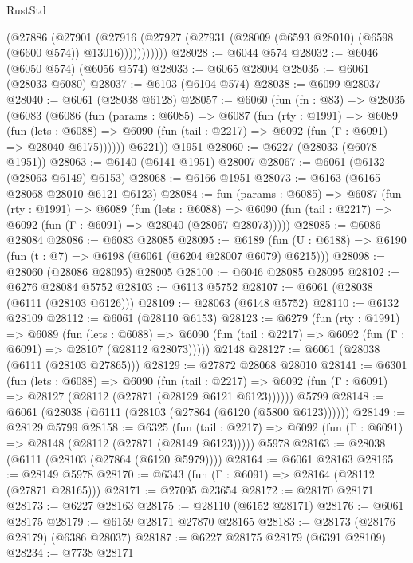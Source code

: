 \begin{lexlean}{RustStd}
\begin{coremodule}
{\begin{coremodule}
{{{{{{{{{{{{{{{{{{{{{{{{{{              (@27886
                (@27901
                  (@27916
                    (@27927 (@27931 (@28009 (@6593 @28010) (@6598 (@6600 @574)) @13016)))))))))))
@28028 := @6044 @574
@28032 := @6046 (@6050 @574) (@6056 @574)
@28033 := @6065 @28004
@28035 := @6061 (@28033 @6080)
@28037 := @6103 (@6104 @574)
@28038 := @6099 @28037
@28040 := @6061 (@28038 @6128)
@28057 := @6060
    (fun (fn : @83) =>
    @28035
      (@6083
        (@6086
          (fun (params : @6085) =>
          @6087
            (fun (rty : @1991) =>
            @6089
              (fun (lets : @6088) =>
              @6090 (fun (tail : @2217) => @6092 (fun (Γ : @6091) => @28040 @6175))))))
        @6221))
    @1951
@28060 := @6227 (@28033 (@6078 @1951))
@28063 := @6140 (@6141 @1951) @28007
@28067 := @6061 (@6132 (@28063 @6149) @6153)
@28068 := @6166 @1951
@28073 := @6163 (@6165 @28068 @28010 @6121 @6123)
@28084 := fun (params : @6085) =>
  @6087
    (fun (rty : @1991) =>
    @6089
      (fun (lets : @6088) =>
      @6090 (fun (tail : @2217) => @6092 (fun (Γ : @6091) => @28040 (@28067 @28073)))))
@28085 := @6086 @28084
@28086 := @6083 @28085
@28095 := @6189
    (fun (U : @6188) => @6190 (fun (t : @7) => @6198 (@6061 (@6204 @28007 @6079) @6215)))
@28098 := @28060 (@28086 @28095) @28005
@28100 := @6046 @28085 @28095
@28102 := @6276 @28084 @5752
@28103 := @6113 @5752
@28107 := @6061 (@28038 (@6111 (@28103 @6126)))
@28109 := @28063 (@6148 @5752)
@28110 := @6132 @28109
@28112 := @6061 (@28110 @6153)
@28123 := @6279
    (fun (rty : @1991) =>
    @6089
      (fun (lets : @6088) =>
      @6090 (fun (tail : @2217) => @6092 (fun (Γ : @6091) => @28107 (@28112 @28073)))))
    @2148
@28127 := @6061 (@28038 (@6111 (@28103 @27865)))
@28129 := @27872 @28068 @28010
@28141 := @6301
    (fun (lets : @6088) =>
    @6090
      (fun (tail : @2217) =>
      @6092 (fun (Γ : @6091) => @28127 (@28112 (@27871 (@28129 @6121 @6123))))))
    @5799
@28148 := @6061 (@28038 (@6111 (@28103 (@27864 (@6120 (@5800 @6123))))))
@28149 := @28129 @5799
@28158 := @6325
    (fun (tail : @2217) => @6092 (fun (Γ : @6091) => @28148 (@28112 (@27871 (@28149 @6123)))))
    @5978
@28163 := @28038 (@6111 (@28103 (@27864 (@6120 @5979))))
@28164 := @6061 @28163
@28165 := @28149 @5978
@28170 := @6343 (fun (Γ : @6091) => @28164 (@28112 (@27871 @28165)))
@28171 := @27095 @23654
@28172 := @28170 @28171
@28173 := @6227 @28163
@28175 := @28110 (@6152 @28171)
@28176 := @6061 @28175
@28179 := @6159 @28171 @27870 @28165
@28183 := @28173 (@28176 @28179) (@6386 @28037)
@28187 := @6227 @28175 @28179 (@6391 @28109)
@28234 := @7738
    @28171
}}}}}}}}}}}}}}}}}}}}}}}}}}
\end{coremodule}}
\end{coremodule}
\end{lexlean}
